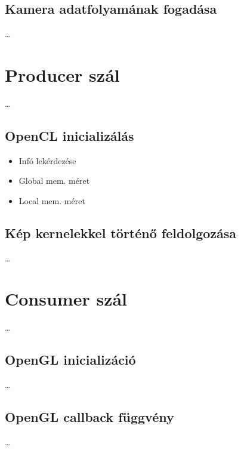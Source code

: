 \subsection{Kamera adatfolyamának fogadása}
\ldots

\section{Producer szál}
\dots
\subsection{OpenCL inicializálás}
\begin{itemize}
	\item Infó lekérdezése
	\item Global mem. méret
	\item Local mem. méret
\end{itemize}

\subsection{Kép kernelekkel történő feldolgozása}
\ldots

\section{Consumer szál}
\dots
\subsection{OpenGL inicializáció}
\ldots

\subsection{OpenGL callback függvény}
\dots
